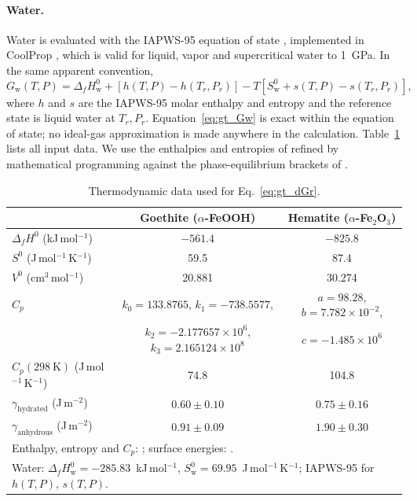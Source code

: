 \paragraph{Water.} Water is evaluated with the IAPWS-95 equation of state \citep{wagner2002},
implemented in CoolProp \citep{bell2014}, which is valid for liquid, vapor and supercritical
water to 1~GPa. In the same apparent convention,
\begin{equation}
  G_{\mathrm{w}}(T,P) = \Delta_f H_{\mathrm{w}}^{0} + \left[h(T,P) - h(T_r,P_r)\right]
  - T\left[S_{\mathrm{w}}^{0} + s(T,P) - s(T_r,P_r)\right],
  \label{eq:gt_Gw}
\end{equation}
where $h$ and $s$ are the IAPWS-95 molar enthalpy and entropy and the reference state is liquid
water at $T_r,P_r$. Equation~\ref{eq:gt_Gw} is exact within the equation of state; no ideal-gas
approximation is made anywhere in the calculation. Table~\ref{tab:gt_thermo_data} lists all
input data. We use the enthalpies and entropies of \citet{majzlan2003b} refined by mathematical
programming against the phase-equilibrium brackets of \citet{voigt1981}.

\begin{table}
  \centering
  \caption{Thermodynamic data used for Eq.~\ref{eq:gt_dGr}.}
  \label{tab:gt_thermo_data}
  \begin{tabular}{lcc}
    \hline
    & Goethite ($\alpha$-FeOOH) & Hematite ($\alpha$-Fe$_2$O$_3$) \\
    \hline
    $\Delta_f H^0$ (kJ\,mol$^{-1}$) & $-561.4$ & $-825.8$ \\
    $S^0$ (J\,mol$^{-1}$\,K$^{-1}$) & 59.5 & 87.4 \\
    $V^0$ (cm$^3$\,mol$^{-1}$) & 20.881 & 30.274 \\
    $C_p$ & $k_0=133.8765$, $k_1=-738.5577$, & $a=98.28$, $b=7.782\times10^{-2}$, \\
          & $k_2=-2.177657\times10^{6}$, $k_3=2.165124\times10^{8}$ & $c=-1.485\times10^{6}$ \\
    $C_p(298\ \mathrm{K})$ (J\,mol$^{-1}$\,K$^{-1}$) & 74.8 & 104.8 \\
    $\gamma_{\mathrm{hydrated}}$ (J\,m$^{-2}$) & $0.60\pm0.10$ & $0.75\pm0.16$ \\
    $\gamma_{\mathrm{anhydrous}}$ (J\,m$^{-2}$) & $0.91\pm0.09$ & $1.90\pm0.30$ \\
    \hline
    \multicolumn{3}{l}{\footnotesize Enthalpy, entropy and $C_p$: \citet{majzlan2003a,majzlan2003b}; surface energies: \citet{navrotsky2008}.}\\
    \multicolumn{3}{l}{\footnotesize Water: $\Delta_f H^0_{\mathrm{w}} = -285.83$~kJ\,mol$^{-1}$, $S^0_{\mathrm{w}} = 69.95$~J\,mol$^{-1}$\,K$^{-1}$; IAPWS-95 for $h(T,P)$, $s(T,P)$.}
  \end{tabular}
\end{table}

